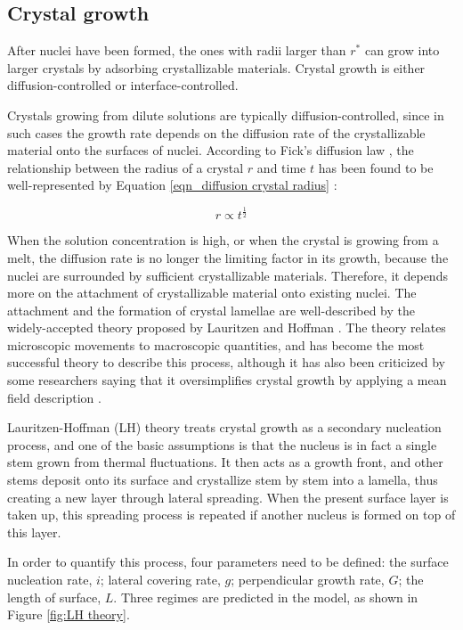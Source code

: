 \subsection{Crystal growth}

After nuclei have been formed, the ones with radii larger than $r^{*}$ can grow into larger crystals by adsorbing crystallizable materials. Crystal growth is either diffusion-controlled or interface-controlled.

Crystals growing from dilute solutions are typically diffusion-controlled, since in such cases the growth rate depends on the diffusion rate of the crystallizable material onto the surfaces of nuclei. According to Fick's diffusion law \cite{Fick1855,FickZiirich1995}, the relationship between the radius of a crystal $r$ and time $t$ has been found to be well-represented by Equation \ref{eqn_diffusion crystal radius} \cite{Ouyang1998,Ouyang1999,HaoOuyang2004,Naga2013}:

\begin{equation}
\label{eqn_diffusion crystal radius}
r \propto t^{\frac{1}{2}}
\end{equation}

When the solution concentration is high, or when the crystal is growing from a melt, the diffusion rate is no longer the limiting factor in its growth, because the nuclei are surrounded by sufficient crystallizable materials. Therefore, it depends more on the attachment of crystallizable material onto existing nuclei. The attachment and the formation of crystal lamellae are well-described by the widely-accepted theory proposed by Lauritzen and Hoffman \cite{Lauritzen,Hoffman,Lauritzen1973}. The theory relates microscopic movements to macroscopic quantities, and has become the most successful theory to describe this process, although it has also been criticized by some researchers saying that it oversimplifies crystal growth by applying a mean field description \cite{Zhang2016a}.

Lauritzen-Hoffman (LH) theory treats crystal growth as a secondary nucleation process, and one of the basic assumptions is that the nucleus is in fact a single stem grown from thermal fluctuations. It then acts as a growth front, and other stems deposit onto its surface and crystallize stem by stem into a lamella, thus creating a new layer through lateral spreading. When the present surface layer is taken up, this spreading process is repeated if another nucleus is formed on top of this layer.

In order to quantify this process, four parameters need to be defined: the surface nucleation rate, $i$; lateral covering rate, $g$; perpendicular growth rate, $G$; the length of surface, $L$. Three regimes are predicted in the model, as shown in Figure \ref{fig:LH theory}.

